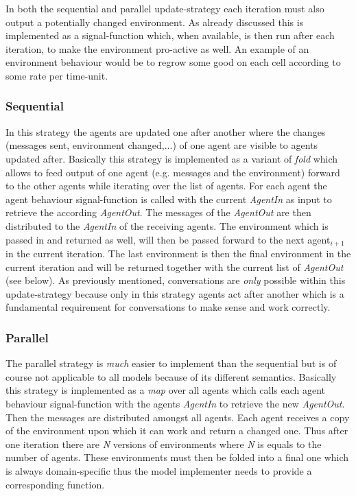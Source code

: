 In both the sequential and parallel update-strategy each iteration must also output a potentially changed environment. As already discussed this is implemented as a signal-function which, when available, is then run after each iteration, to make the environment pro-active as well. An example of an environment behaviour would be to regrow some good on each cell according to some rate per time-unit.

\subsubsection{Sequential}
In this strategy the agents are updated one after another where the changes (messages sent, environment changed,...) of one agent are visible to agents updated after. Basically this strategy is implemented as a variant of \textit{fold} which allows to feed output of one agent (e.g. messages and the environment) forward to the other agents while iterating over the list of agents. For each agent the agent behaviour signal-function is called with the current \textit{AgentIn} as input to retrieve the according \textit{AgentOut}. The messages of the \textit{AgentOut} are then distributed to the \textit{AgentIn} of the receiving agents.
The environment which is passed in and returned as well, will then be passed forward to the next agent$_{i + 1}$ in the current iteration. The last environment is then the final environment in the current iteration and will be returned together with the current list of \textit{AgentOut} (see below). As previously mentioned, conversations are \textit{only} possible within this update-strategy because only in this strategy agents act after another which is a fundamental requirement for conversations to make sense and work correctly.

\subsubsection{Parallel}
The parallel strategy is \textit{much} easier to implement than the sequential but is of course not applicable to all models because of its different semantics. Basically this strategy is implemented as a \textit{map} over all agents which calls each agent behaviour signal-function with the agents \textit{AgentIn} to retrieve the new \textit{AgentOut}. Then the messages are distributed amongst all agents.
Each agent receives a copy of the environment upon which it can work and return a changed one. Thus after one iteration there are \textit{N} versions of environments where \textit{N} is equals to the number of agents. These environments must then be folded into a final one which is always domain-specific thus the model implementer needs to provide a corresponding function.

